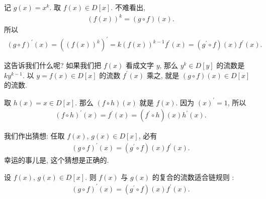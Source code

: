 记 $g(x) = x^k$. 取 $f(x) \in D[x]$. 不难看出,
\begin{align*}
    (f(x))^k = (g \circ f)(x).
\end{align*}
所以
\begin{align*}
    (g \circ f)^{\prime}(x) = ((f(x))^k)^{\prime} = k(f(x))^{k-1} f^{\prime} (x) = (g^{\prime} \circ f)(x) f^{\prime} (x).
\end{align*}

这告诉我们什么呢? 如果我们把 $f(x)$ 看成文字 $y$, 那么 $y^k \in D[y]$ 的流数是 $ky^{k-1}$. 以 $y = f(x) \in D[x]$ 的流数 $f^{\prime} (x)$ 乘之, 就是 $(g \circ f) (x) \in D[x]$ 的流数.

取 $h(x) = x \in D[x]$. 那么 $(f \circ h)(x)$ 就是 $f(x)$. 因为 $(x)^{\prime} = 1$, 所以
\begin{align*}
    (f \circ h)^{\prime} (x) = f^{\prime} (x) = (f^{\prime} \circ h) (x) h^{\prime} (x).
\end{align*}

我们作出猜想: 任取 $f(x)$, $g(x) \in D[x]$, 必有
\begin{align*}
    (g \circ f)^{\prime} (x) = (g^{\prime} \circ f)(x) f^{\prime} (x).
\end{align*}
幸运的事儿是, 这个猜想是正确的.

\begin{proposition}
    设 $f(x)$, $g(x) \in D[x]$. 则 $f(x)$ 与 $g(x)$ 的复合的流数适合链规则 :
    \begin{align*}
        (g \circ f)^{\prime} (x) = (g^{\prime} \circ f)(x) f^{\prime} (x).
    \end{align*}
\end{proposition}

